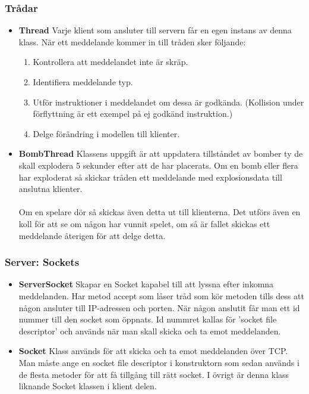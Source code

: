 \documentclass[10pt, titlepage, oneside, a4paper]{article}
\begin{document}
    		\subsubsection{Trådar}
    		\begin{itemize}
    			\item\textbf{Thread}
    			Varje klient som ansluter till servern får en egen instans av denna klass. När ett meddelande kommer in till tråden sker följande:
    			\begin{enumerate}
    				\item Kontrollera att meddelandet inte är skräp.
    				\item Identifiera meddelande typ.
    				\item Utför instruktioner i meddelandet om dessa är godkända. (Kollision under förflyttning är ett exempel på ej godkänd instruktion.)
    				\item Delge förändring i modellen till klienter.
    			\end{enumerate}
    			\item\textbf{BombThread}
    			Klassens uppgift är att uppdatera tillståndet av bomber ty de skall explodera 5 sekunder efter att de har placerats. Om en bomb eller flera har exploderat så skickar tråden ett meddelande med explosionsdata till anslutna klienter.\\\\Om en spelare dör så skickas även detta ut till klienterna. Det utförs även en koll för att se om någon har vunnit spelet, om så är fallet skickas ett meddelande återigen för att delge detta.
    		\end{itemize}
    		
    		\newpage
    		\subsubsection{Server: Sockets}
    		\begin{itemize}
    			\item\textbf{ServerSocket}
    			Skapar en Socket kapabel till att lyssna efter inkomna meddelanden. Har metod accept som låser tråd som kör metoden tills dess att någon ansluter till IP-adressen och porten. När någon anslutit får man ett id nummer till den socket som öppnats. Id nummret kallas för 'socket file descriptor' och används när man skall skicka och ta emot meddelanden.
    			\item\textbf{Socket}
    			Klass används för att skicka och ta emot meddelanden över TCP. Man måste ange en socket file descriptor i konstruktorn som sedan används i de flesta metoder för att få tillgång till rätt socket. I övrigt är denna klass liknande Socket klassen i klient delen.
    		\end{itemize}
    		
\end{document}

